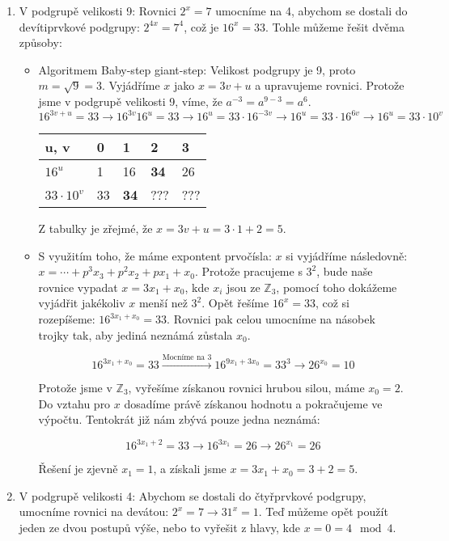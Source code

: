 \documentclass[10pt,a4paper]{article}
\begin{document}
\begin{enumerate}
\item V podgrupě velikosti 9: Rovnici $2^x = 7$ umocníme na 4, abychom se dostali do devítiprvkové podgrupy: $2^{4x} = 7^4$, což je $16^x = 33$. Tohle můžeme řešit dvěma způsoby:
\begin{itemize}
\item Algoritmem Baby-step giant-step: Velikost podgrupy je 9, proto $m = \sqrt{9} = 3$. Vyjádříme $x$ jako $x = 3v + u$ a upravujeme rovnici. Protože jsme v podgrupě velikosti 9, víme, že $a^{-3} = a^{9-3} = a^6$.
$$16^{3v+u} = 33 \xrightarrow{}16^{3v}16^u = 33 \xrightarrow{}16^u = 33\cdot 16^{-3v} \xrightarrow{} 16^u = 33\cdot 16^{6v} \xrightarrow{}16^u = 33\cdot 10^v$$

\begin{table}[h!]
\centering
\begin{tabular}{|p{1cm}|p{1cm}|p{1cm}|p{1cm}|p{1cm}|}
\hline
u, v & 0 & 1 & 2 & 3\\
\hline
\hline
$16^u$ & 1 & 16 & \textbf{34} & 26\\
\hline
$33\cdot 10^v$ & 33 & \textbf{34} & ??? & ??? \\
\hline
\end{tabular}
\end{table}

Z tabulky je zřejmé, že $x = 3v + u = 3\cdot 1 + 2 = 5$.

\item S využitím toho, že máme expontent prvočísla: $x$ si vyjádříme následovně: $x = \cdots + p^3x_3 + p^2x_2 + px_1 + x_0$. Protože pracujeme s $3^2$, bude naše rovnice vypadat $x = 3x_1 + x_0$, kde $x_i$ jsou ze $\mathbb{Z}_{3}$, pomocí toho dokážeme vyjádřit jakékoliv $x$ menší než $3^2$. Opět řešíme $16^x = 33$, což si rozepíšeme:  $16^{3x_1 + x_0} = 33$. Rovnici pak celou umocníme na násobek trojky tak, aby jediná neznámá zůstala $x_0$. 

$$ 16^{3x_1 + x_0} = 33  \xrightarrow{\text{Mocníme na 3}} 16^{9x_1 + 3x_0} = 33^3 \xrightarrow{} 26^{x_0} = 10$$

Protože jsme v $\mathbb{Z}_{3}$, vyřešíme získanou rovnici hrubou silou, máme $x_0 = 2$. Do vztahu pro $x$ dosadíme právě získanou hodnotu a pokračujeme ve výpočtu. Tentokrát již nám zbývá pouze jedna neznámá:

$$ 16^{3x_1 + 2} = 33  \xrightarrow{} 16^{3x_1} = 26 \xrightarrow{} 26^{x_1} = 26$$

Řešení je zjevně $x_1 = 1$, a získali jsme $x = 3x_1 + x_0 = 3 + 2 = 5$.
\end{itemize}
\item V podgrupě velikosti 4: Abychom se dostali do čtyřprvkové podgrupy, umocníme rovnici na devátou: $2^x = 7 \rightarrow{} 31^x = 1$. Teď můžeme opět použít jeden ze dvou postupů výše, nebo to vyřešit z hlavy, kde $x = 0 = 4 \mod 4$.
\end{enumerate}
\end{document}
